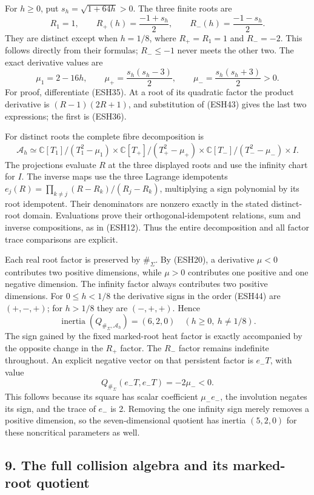 \documentclass[
  10pt,
  a4paper,
]{article}
\begin{document}
For \(h\ge0\), put \(s_h=\sqrt{1+64h}>0\). The three finite roots are \[
R_1=1,\qquad R_+(h)=\frac{-1+s_h}{2},\qquad
R_-(h)=\frac{-1-s_h}{2}.
\tag{ESH43}
\] They are distinct except when \(h=1/8\), where \(R_+=R_1=1\) and
\(R_-=-2\). This follows directly from their formulas; \(R_-\le-1\)
never meets the other two. The exact derivative values are \[
\mu_1=2-16h,\qquad
\mu_+=\frac{s_h(s_h-3)}2,\qquad
\mu_-=\frac{s_h(s_h+3)}2>0.
\tag{ESH44}
\] For proof, differentiate (ESH35). At a root of its quadratic factor
the product derivative is \((R-1)(2R+1)\), and substitution of (ESH43)
gives the last two expressions; the first is (ESH36).

For distinct roots the complete fibre decomposition is \[
\mathcal A_h\simeq
\mathbb C[T_1]/(T_1^2-\mu_1)
\times\mathbb C[T_+]/(T_+^2-\mu_+)
\times\mathbb C[T_-]/(T_-^2-\mu_-)
\times I.
\tag{ESH45}
\] The projections evaluate \(R\) at the three displayed roots and use
the infinity chart for \(I\). The inverse maps use the three Lagrange
idempotents \(e_j(R)=\prod_{k\ne j}(R-R_k)/(R_j-R_k)\), multiplying a
sign polynomial by its root idempotent. Their denominators are nonzero
exactly in the stated distinct-root domain. Evaluations prove their
orthogonal-idempotent relations, sum and inverse compositions, as in
(ESH12). Thus the entire decomposition and all factor trace comparisons
are explicit.

Each real root factor is preserved by \(\#_\Sigma\). By (ESH20), a
derivative \(\mu<0\) contributes two positive dimensions, while
\(\mu>0\) contributes one positive and one negative dimension. The
infinity factor always contributes two positive dimensions. For
\(0\le h<1/8\) the derivative signs in the order (ESH44) are
\((+,-,+)\); for \(h>1/8\) they are \((-,+,+)\). Hence \[
\boxed{\operatorname{inertia}(Q_{\#_\Sigma,\mathcal A_h})=(6,2,0)
\quad(h\ge0,\ h\ne1/8).}
\tag{ESH46}
\] The sign gained by the fixed marked-root heat factor is exactly
accompanied by the opposite change in the \(R_+\) factor. The \(R_-\)
factor remains indefinite throughout. An explicit negative vector on
that persistent factor is \(e_-T\), with value \[
Q_{\#_\Sigma}(e_-T,e_-T)=-2\mu_-<0.
\tag{ESH47}
\] This follows because its square has scalar coefficient \(\mu_-e_-\),
the involution negates its sign, and the trace of \(e_-\) is 2. Removing
the one infinity sign merely removes a positive dimension, so the
seven-dimensional quotient has inertia \((5,2,0)\) for these noncritical
parameters as well.

\subsection{9. The full collision algebra and its marked-root
quotient}\label{the-full-collision-algebra-and-its-marked-root-quotient}
\end{document}

